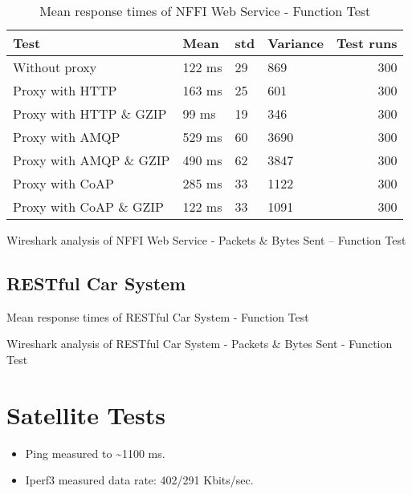 \begin{appendices}
\begin{table}[H]
\begin{tabular}{llllr}
\hline
 Test                   &   Mean &   \gls{std} &   Variance &   Test runs \\
\hline
  Without proxy & 122 ms & 29 & 869 & 300 \\
  Proxy with HTTP & 163 ms & 25 & 601 & 300 \\
  Proxy with HTTP \& GZIP & 99 ms & 19 & 346 & 300 \\
  Proxy with AMQP & 529 ms & 60 & 3690 & 300 \\
  Proxy with AMQP \& GZIP & 490 ms & 62 & 3847 & 300\\
  Proxy with CoAP & 285 ms & 33 & 1122 & 300 \\
  Proxy with CoAP \& GZIP & 122 ms & 33 & 1091 & 300 \\
\end{tabular}
\caption{Mean response times of NFFI Web Service - Function Test}
\end{table}

\begin{table}[H]

\caption{Wireshark analysis of NFFI Web Service - Packets \& Bytes Sent -- Function Test}
\end{table}

\subsection{RESTful Car System}

\begin{table}[H]

\caption{Mean response times of RESTful Car System - Function Test}
\end{table}

\begin{table}[H]

\caption{Wireshark analysis of RESTful Car System - Packets \& Bytes Sent - Function Test}
\end{table}

\section{Satellite Tests}

\begin{itemize}
	\item Ping measured to \textasciitilde 1100 ms.
	\item Iperf3 measured data rate: 402/291 Kbits/sec.
\end{itemize}


\end{appendices}
